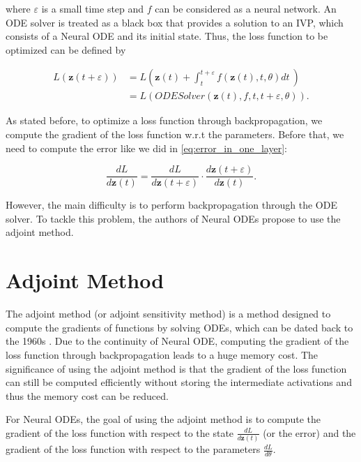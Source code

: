 \documentclass[
	parskip, 			   %
	twoside, 			   %
	DIV=14, 			   %
	BCOR=15.0mm, 		   %
	headsepline, 		   %
	open=right, 		   %
	captions=tableheading, %
	bibliography=totoc,    %
	numbers=noenddot       %
]{scrreprt}
\begin{document}
where $\varepsilon $ is a small time step and $f$ can be considered as a neural network. An ODE solver is treated as a black box that provides a solution to an IVP, which consists of a Neural ODE and its initial state. Thus, the loss function to be optimized can be defined by

\begin{equation}
    \label{eq:Neural_ODE_Gradient_loss}
    \begin{aligned}
    L(\mathbf{z}(t+\varepsilon )) &= L(\mathbf{z}(t) + \int_{t}^{t+\varepsilon } f(\mathbf{z}(t), t, \theta)dt \:)\\
    &= L(ODESolver(\mathbf{z}(t), f, t, t+\varepsilon , \theta)).
    \end{aligned}
\end{equation}

As stated before, to optimize a loss function through backpropagation, we compute the gradient of the loss function w.r.t the parameters. Before that, we need to compute the error like we did in \ref{eq:error_in_one_layer}:

\begin{equation}
    \label{eq:Neural_ODE_error}
    \frac{d L}{d\mathbf{z}(t)} = \frac{d L}{d\mathbf{z}(t+\varepsilon )} \cdot \frac{d\mathbf{z}(t+\varepsilon )}{d\mathbf{z}(t)}.
\end{equation}

However, the main difficulty is to perform backpropagation through the ODE solver. To tackle this problem, the authors of Neural ODEs propose to use the adjoint method.


\section{Adjoint Method}
The adjoint method (or adjoint sensitivity method) is a method designed to compute the gradients of functions by solving ODEs, which can be dated back to the 1960s \cite{boltyanskiy1962mathematical}. Due to the continuity of Neural ODE, computing the gradient of the loss function through backpropagation leads to a huge memory cost. The significance of using the adjoint method is that the gradient of the loss function can still be computed efficiently without storing the intermediate activations and thus the memory cost can be reduced.

For Neural ODEs, the goal of using the adjoint method is to compute the gradient of the loss function with respect to the state $\frac{d L}{d\mathbf{z}(t)}$ (or the error) and the gradient of the loss function with respect to the parameters $\frac{d L}{d\theta}$.
\end{document}
